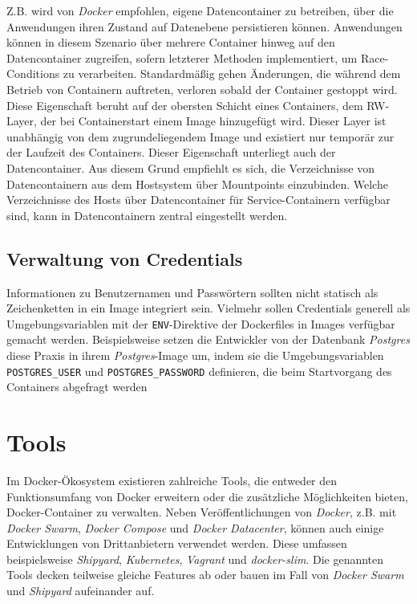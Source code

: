 \documentclass[../main.tex]{subfiles}
\begin{document}
      Z.B. wird von \emph{Docker} empfohlen, eigene Datencontainer zu betreiben, über die Anwendungen ihren Zustand auf Datenebene persistieren können. Anwendungen können in diesem Szenario über mehrere Container hinweg auf den Datencontainer zugreifen, sofern letzterer Methoden implementiert, um Race-Conditions zu verarbeiten. Standardmäßig gehen Änderungen, die während dem Betrieb von Containern auftreten, verloren sobald der Container gestoppt wird. Diese Eigenschaft beruht auf der obersten Schicht eines Containers, dem RW-Layer, der bei Containerstart einem Image hinzugefügt wird. Dieser Layer ist unabhängig von dem zugrundeliegendem Image und existiert nur temporär zur der Laufzeit des Containers. Dieser Eigenschaft unterliegt auch der Datencontainer. Aus diesem Grund empfiehlt es sich, die Verzeichnisse von Datencontainern aus dem Hostsystem über Mountpoints einzubinden. Welche Verzeichnisse des Hosts über Datencontainer für Service-Containern verfügbar sind, kann in Datencontainern zentral eingestellt werden.


    \subsection{Verwaltung von Credentials}
      Informationen zu Benutzernamen und Passwörtern sollten nicht statisch als Zeichenketten in ein Image integriert sein. Vielmehr sollen Credentials generell als Umgebungsvariablen mit der \texttt{ENV}-Direktive der Dockerfiles in Images verfügbar gemacht werden. Beispielsweise setzen die Entwickler von der Datenbank \emph{Postgres} diese Praxis in ihrem \emph{Postgres}-Image um, indem sie die Umgebungsvariablen \texttt{POSTGRES\_USER} und \texttt{POSTGRES\_PASSWORD} definieren, die beim Startvorgang des Containers abgefragt werden \cite{https://hub.docker.com/_/postgres/}\cite{https://github.com/docker-library/postgres/blob/443c7947d548b1c607e06f7a75ca475de7ff3284/9.5/docker-entrypoint.sh}
  \section{Tools}
    Im Docker-Ökosystem existieren zahlreiche Tools, die entweder den Funktionsumfang von Docker erweitern oder die zusätzliche Möglichkeiten bieten, Docker-Container zu verwalten. Neben Veröffentlichungen von \emph{Docker}, z.B. mit \emph{Docker Swarm}, \emph{Docker Compose} und \emph{Docker Datacenter}, können auch einige Entwicklungen von Drittanbietern verwendet werden. Diese umfassen beispielsweise \emph{Shipyard}, \emph{Kubernetes}, \emph{Vagrant} und \emph{docker-slim}. Die genannten Tools decken teilweise gleiche Features ab oder bauen im Fall von \emph{Docker Swarm} und \emph{Shipyard} aufeinander auf.
\end{document}

